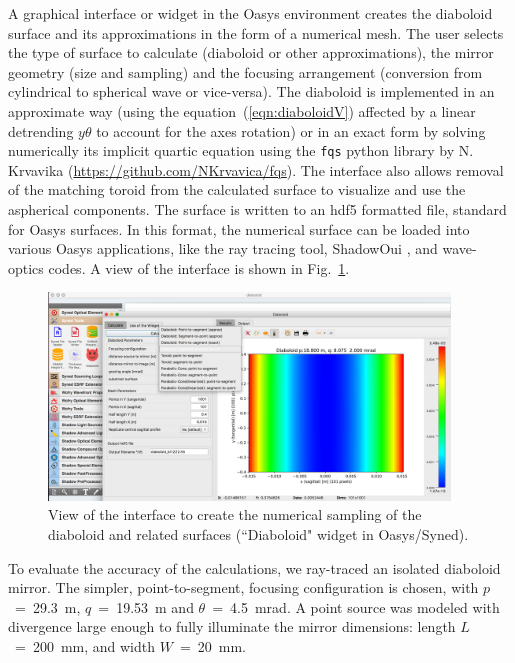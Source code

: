 \documentclass[preprint]{iucr}       %
\begin{document}
A graphical interface or widget in the Oasys environment creates the diaboloid surface and its approximations in the form of a numerical mesh. The user selects the type of surface to calculate (diaboloid or other approximations), the mirror geometry (size and sampling) and the focusing arrangement (conversion from cylindrical to spherical wave or vice-versa). 
The diaboloid is implemented in an approximate way (using the equation~(\ref{eqn:diaboloidV}) affected by a linear detrending $y\theta$ to account for the axes rotation) or in an exact form by solving numerically its implicit quartic equation \cite{val2021} using the {\tt fqs} python library by N. Krvavika (\url{https://github.com/NKrvavica/fqs}). 
The interface also allows removal of the matching toroid from the calculated surface to visualize and use the aspherical components. The surface is written to an hdf5 formatted file, standard for Oasys surfaces. In this format, the numerical surface can be loaded into various Oasys applications, like the ray tracing tool, ShadowOui \cite{codeSHADOWOUI}, and wave-optics codes. A view of the interface is shown in Fig.~\ref{fig:widget}.

\begin{figure}\label{fig:widget}
\centering
\includegraphics[width=0.95\textwidth]{figures/widget.png}
\caption{View of the interface to create the numerical sampling of the diaboloid and related surfaces (``Diaboloid" widget in Oasys/Syned).}
\end{figure}

To evaluate the accuracy of the calculations, we ray-traced an isolated diaboloid mirror. The simpler, point-to-segment, focusing configuration is chosen, with $p$~=~\SI{29.3}{\meter}, $q$~=~\SI{19.53}{\meter} and $\theta$~=~\SI{4.5}{\milli\radian}. A point source was modeled with divergence large enough to fully illuminate the mirror dimensions: length $L$~=~\SI{200}{\milli\meter}, and width $W$~=~\SI{20}{\milli\meter}.
\end{document}
